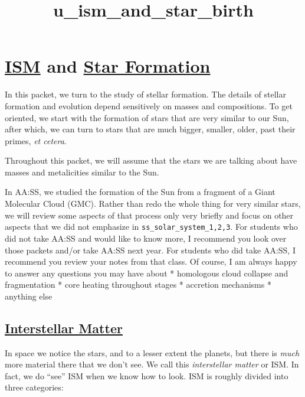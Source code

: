 \documentclass[11pt]{article}
\title{u\_ism\_and\_star\_birth}
\begin{document}
    
    \maketitle
    
    

    
    \section{\texorpdfstring{\href{https://en.wikipedia.org/wiki/Interstellar_medium}{ISM}
and \href{https://en.wikipedia.org/wiki/Star_formation}{Star
Formation}}{ISM and Star Formation}}\label{ism-and-star-formation}

In this packet, we turn to the study of stellar formation. The details
of stellar formation and evolution depend sensitively on masses and
compositions. To get oriented, we start with the formation of stars that
are very similar to our Sun, after which, we can turn to stars that are
much bigger, smaller, older, past their primes, \emph{et cetera}.

 
Throughout this packet, we will assume that the stars we are talking
about have masses and metalicities similar to the Sun.
 

In AA:SS, we studied the formation of the Sun from a fragment of a Giant
Molecular Cloud (GMC). Rather than redo the whole thing for very similar
stars, we will review some aspects of that process only very briefly and
focus on other aspects that we did not emphasize in
\texttt{ss\_solar\_system\_1,2,3}. For students who did not take AA:SS
and would like to know more, I recommend you look over those packets
and/or take AA:SS next year. For students who did take AA:SS, I
recommend you review your notes from that class. Of course, I am always
happy to answer any questions you may have about * homologous cloud
collapse and fragmentation * core heating throughout stages * accretion
mechanisms * anything else

\subsection{\texorpdfstring{\href{https://en.wikipedia.org/wiki/Interstellar_medium}{Interstellar
Matter}}{Interstellar Matter}}\label{interstellar-matter}

In space we notice the stars, and to a lesser extent the planets, but
there is \emph{much} more material there that we don't see. We call this
\emph{interstellar matter} or ISM. In fact, we do ``see'' ISM when we
know how to look. ISM is roughly divided into three categories:
\end{document}
